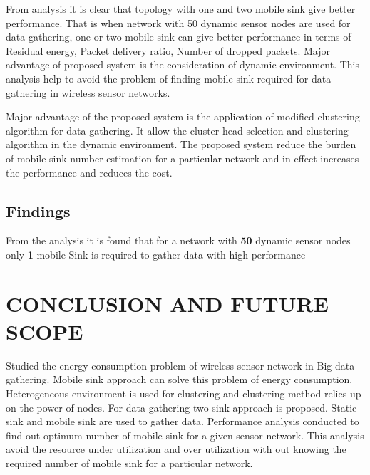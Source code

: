 \documentclass[MTech]{iitmdiss}
\begin{document}
From analysis it is clear that topology with one and two mobile sink give better performance. That is when network with 50 dynamic sensor nodes are used for data gathering, one or two mobile sink can give better performance in terms of Residual energy, Packet delivery ratio, Number of dropped packets. Major advantage of proposed system is the consideration of dynamic environment. This analysis help to avoid the problem of finding mobile sink required for data gathering in wireless sensor networks.

Major advantage of the proposed system is the application of modified clustering algorithm for data gathering. It allow the cluster head selection and clustering algorithm in the dynamic environment. The proposed system reduce the burden of mobile sink number estimation for a particular network and in effect increases the performance and reduces the cost.
\section{Findings}
From the analysis it is found that for a network with \textbf{50} dynamic sensor nodes only \textbf{1} mobile Sink is required to gather data with high performance
\pagebreak
\clearpage
\chapter{CONCLUSION AND FUTURE SCOPE}
\label {conc}
Studied the energy consumption problem of wireless sensor network in Big data gathering. Mobile sink approach can solve this problem of energy consumption. Heterogeneous environment is used for clustering and clustering method relies up on the power of nodes. For data gathering two sink approach is proposed. Static sink and mobile sink are used to gather data. Performance analysis conducted to find out optimum number of mobile sink for a given sensor network. This analysis avoid the resource under utilization and over utilization with out knowing the required number of mobile sink for a particular network.
\end{document}
